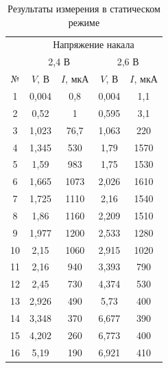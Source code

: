 \documentclass[a4paper, 12pt]{article}
\begin{document}
\begin{table}[h!]
\begin{center}
\caption{Результаты измерения в статическом режиме}
\begin{tabular}{|c|c|c|c|c|}
\hline
\multirow{}{}{} & \multicolumn{4}{c|}{Напряжение накала}                  \\ \cline{2-5} 
                  & \multicolumn{2}{c|}{2,4 В} & \multicolumn{2}{c|}{2,6 В} \\ \hline
№                 & $V$, В      & $I$, мкА     & $V$, В      & $I$, мкА     \\ \hline
1                 & 0,004       & 0,8          & 0,004       & 1,1          \\ \hline
2                 & 0,52        & 1            & 0,595       & 3,1          \\ \hline
3                 & 1,023       & 76,7         & 1,063       & 220          \\ \hline
4                 & 1,345       & 530          & 1,79        & 1570         \\ \hline
5                 & 1,59        & 983          & 1,75        & 1530         \\ \hline
6                 & 1,665       & 1073         & 2,026       & 1610         \\ \hline
7                 & 1,725       & 1110         & 2,16        & 1540         \\ \hline
8                 & 1,86        & 1160         & 2,209       & 1510         \\ \hline
9                 & 1,977       & 1200         & 2,533       & 1280         \\ \hline
10                & 2,15        & 1060         & 2,915       & 1020         \\ \hline
11                & 2,16        & 940          & 3,393       & 790          \\ \hline
12                & 2,45        & 730          & 4,374       & 530          \\ \hline
13                & 2,926       & 490          & 5,73        & 400          \\ \hline
14                & 3,348       & 370          & 6,677       & 390          \\ \hline
15                & 4,202       & 260          & 6,773       & 400          \\ \hline
16                & 5,19        & 190          & 6,921       & 410          \\ \hline

\end{tabular}
\end{center}
\end{table}
\end{document}
